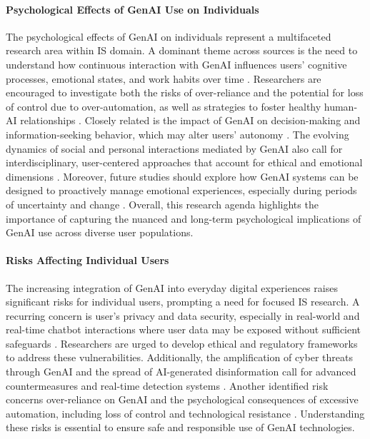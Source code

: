\paragraph{Psychological Effects of GenAI Use on Individuals}
The psychological effects of GenAI on individuals represent a multifaceted research area within IS domain. A dominant theme across sources is the need to understand how continuous interaction with GenAI influences users’ cognitive processes, emotional states, and work habits over time \parencite{R05, R07, R08, R09, R10}. Researchers are encouraged to investigate both the risks of over-reliance and the potential for loss of control due to over-automation, as well as strategies to foster healthy human-AI relationships \parencite{R07, R08}. Closely related is the impact of GenAI on decision-making and information-seeking behavior, which may alter users’ autonomy \parencite{R07}. The evolving dynamics of social and personal interactions mediated by GenAI also call for interdisciplinary, user-centered approaches that account for ethical and emotional dimensions \parencite{R07, R09, S08}. Moreover, future studies should explore how GenAI systems can be designed to proactively manage emotional experiences, especially during periods of uncertainty and change \parencite{R08}. Overall, this research agenda highlights the importance of capturing the nuanced and long-term psychological implications of GenAI use across diverse user populations.

\paragraph{Risks Affecting Individual Users}
The increasing integration of GenAI into everyday digital experiences raises significant risks for individual users, prompting a need for focused IS research. A recurring concern is user's privacy and data security, especially in real-world and real-time chatbot interactions where user data may be exposed without sufficient safeguards \parencite{S08, S11}. Researchers are urged to develop ethical and regulatory frameworks to address these vulnerabilities. Additionally, the amplification of cyber threats through GenAI and the spread of AI-generated disinformation call for advanced countermeasures and real-time detection systems \parencite{R03, R04}. Another identified risk concerns over-reliance on GenAI and the psychological consequences of excessive automation, including loss of control and technological resistance \parencite{R07, S12}. Understanding these risks is essential to ensure safe and responsible use of GenAI technologies.

